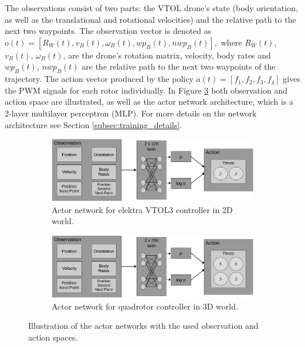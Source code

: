 The observations consist of two parts: the VTOL drone's state (body orientation, as well as the translational and rotational velocities) and the relative path to the next two waypoints. The observation vector is denoted as  $o(t) = \left[R_W(t), v_B(t), \omega_B(t), wp_B(t), nwp_B(t)\right],$ where $R_W(t)$, $v_B(t)$, $\omega_B(t)$, are the drone's rotation matrix, velocity, body rates and $wp_B(t)$, $nwp_B(t)$ are the relative path to the next two waypoints of the trajectory. The action vector produced by the policy $a(t) = \left[f_1,f_2,f_3,f_4\right]$ gives the PWM signals for each rotor individually. In Figure \ref{fig:actor} both observation and action space are illustrated, as well as the actor network architecture, which is a 2-layer multilayer perceptron (MLP). For more details on the network architecture see Section \ref{subsec:training_details}.

\begin{figure}[h]
\centering
\begin{subfigure}[ht]{0.45\textwidth}
    \centering
    \includegraphics[width=1.0\textwidth]{images/2Dactor_short.png}
    \caption{Actor network for elektra VTOL3 controller in 2D world.}
    \label{fig:actor_2D}
\end{subfigure}
\hfill
\begin{subfigure}[h]{0.45\textwidth}
    \centering
    \includegraphics[width=1.0\textwidth]{images/3Dactor_short.png}
    \caption{Actor network for quadrotor controller in 3D world.}
    \label{fig:actor_2D}
\end{subfigure}
\caption{Illustration of the actor networks with the used observation and action spaces.}
\label{fig:actor}
\end{figure}